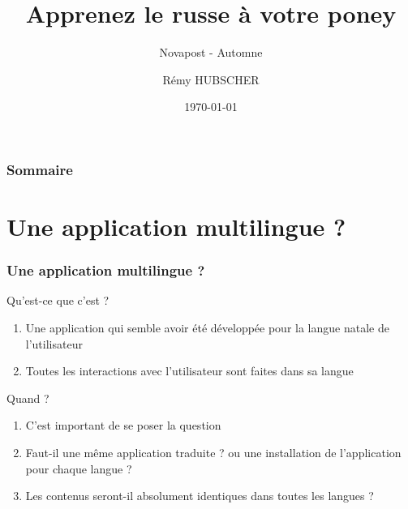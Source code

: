 \documentclass{beamer}
\title[Un poney qui parle le russe]{Apprenez le russe à votre poney}
\subtitle{Novapost - Automne \the\year}
\author{Rémy HUBSCHER}
\institute{remy.hubscher@novapost.fr}
\date{\today}
\begin{document}

\begin{frame}[plain]
  \titlepage
\end{frame}


\begin{frame}
  \frametitle{Sommaire}
\end{frame}


\section{Une application multilingue ?}

\begin{frame}
  \frametitle{Une application multilingue ?}
  \begin{exampleblock}{Qu'est-ce que c'est ?}
    \begin{enumerate}
      \pause \item Une application qui semble avoir été développée pour la langue natale de l'utilisateur
      \pause \item Toutes les interactions avec l'utilisateur sont faites dans sa langue
    \end{enumerate}
  \end{exampleblock}
    \pause
  \begin{alertblock}{Quand ?}
    \begin{enumerate}
      \pause \item C'est important de se poser la question
      \pause \item Faut-il une même application traduite ? ou une installation de l'application pour chaque langue ?
      \pause \item Les contenus seront-il absolument identiques dans toutes les langues ?
    \end{enumerate}
  \end{alertblock}
\end{frame}
\end{document}
